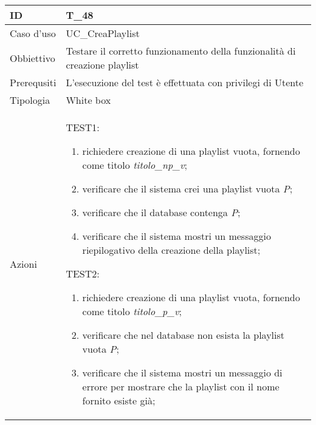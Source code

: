 \begin{table}[hb]
    \centering
    \begin{tabular}{ |p{2cm}|p{10cm}|  }
        \hline
        ID          & T\_48                                                                              \\\hline
        Caso d'uso  & UC\_CreaPlaylist                                                           \\\hline
        Obbiettivo  & Testare il corretto funzionamento della funzionalità di creazione playlist \\\hline
        Prerequsiti & L'esecuzione del test è effettuata con privilegi di Utente                         \\\hline
        Tipologia   & White box                                                                          \\\hline
        Azioni      &
        TEST1:
        \begin{enumerate}[nosep, topsep=0pt]
            \item richiedere creazione di una playlist vuota, fornendo come titolo \emph{titolo\_np\_v};
            \item verificare che il sistema crei una playlist vuota \emph{P};
            \item verificare che il database contenga \emph{P};
            \item verificare che il sistema mostri un messaggio riepilogativo della creazione della playlist;
        \end{enumerate}
        \vspace{0.5cm} TEST2:
        \begin{enumerate}[nosep, topsep=0pt]
            \item richiedere creazione di una playlist vuota, fornendo come titolo \emph{titolo\_p\_v};
            \item verificare che nel database non esista la playlist vuota \emph{P};
            \item verificare che il sistema mostri un messaggio di errore per mostrare che la playlist con il nome fornito esiste già;
        \end{enumerate}
        \\\hline
    \end{tabular}
\end{table}

